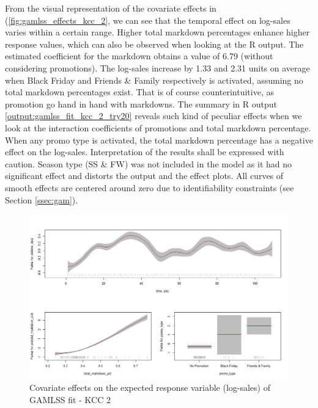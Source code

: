 From the visual representation of the covariate effects in (\autoref{fig:gamlss_effects_kcc_2}, we can see that the temporal effect on log-sales varies within a certain range.
Higher total markdown percentages enhance higher response values, which can also be observed when looking at the R output. The estimated coefficient for the markdown obtains a value of 6.79 (without considering promotions). The log-sales increase by 1.33 and 2.31 units on average when Black Friday and Friends \& Family respectively is activated, assuming no total markdown percentages exist. That is of course counterintuitive, as promotion go hand in hand with markdowns. The summary in R output \ref{output:gamlss_fit_kcc_2_try20} reveals such kind of peculiar effects when we look at the interaction coefficients of promotions and total markdown percentage. When any promo type is activated, the total markdown percentage has a negative effect on the log-sales. Interpretation of the results shall be expressed with caution. Season type (SS \& FW) was not included in the model as it had no significant effect and distorts the output and the effect plots. All curves of smooth effects are centered around zero due to identifiability constraints (see Section \ref{ssec:gam}).
\\



\begin{figure}[H]
\centering
  \includegraphics[width=0.95\linewidth]{figures/gamlss_effects_kcc_2.png}
  \caption{Covariate effects on the expected response variable (log-sales) of GAMLSS fit - KCC 2}
  \label{fig:gamlss_effects_kcc_2}
\end{figure}




